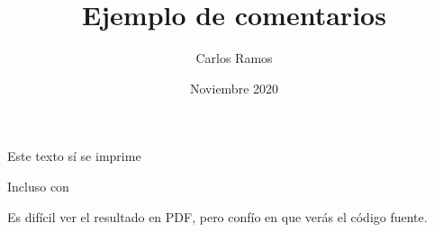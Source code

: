 \documentclass{article}
\title{Ejemplo de comentarios}
\author{Carlos Ramos}
\date{Noviembre 2020}
\begin{document}
\maketitle


Este texto sí se imprime %

Incluso con %

\begin{comment}
Y todo esto es un comentario, que puede que se vea como comentario,
o no, dependiendo del editor que estés utilizando.

Podemos meter muchas instrucciones de \LaTeX{} aquí, pero igual no se
van a tomar en cuenta.

\textbf{Esto debería estar en negritas, pero está comentado}
\end{comment}

Es difícil ver el resultado en PDF, pero confío en que verás
el código fuente.
\end{document}
